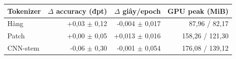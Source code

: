 \begin{tabularx}{\textwidth}{@{}Xrrr@{}}
\toprule
Tokenizer & $\Delta$ accuracy (đpt) & $\Delta$ giây/epoch & GPU peak (MiB) \\
\midrule
Hàng & +0,03 $\pm$ 0,12 & -0,004 $\pm$ 0,017 & 87,96 / 82,17 \\
Patch & +0,00 $\pm$ 0,05 & +0,013 $\pm$ 0,016 & 158,26 / 121,30 \\
CNN-stem & -0,06 $\pm$ 0,30 & -0,001 $\pm$ 0,054 & 176,08 / 139,12 \\
\bottomrule
\end{tabularx}
